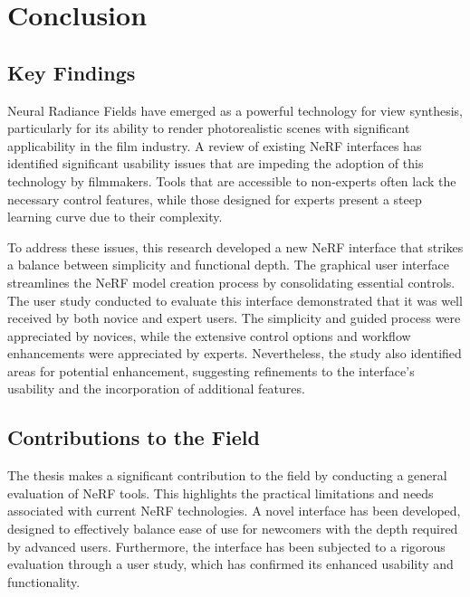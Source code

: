 \chapter{Conclusion}
\label{sec:conclusion}

\section{Key Findings}
\label{sec:conclusion:findings}

Neural Radiance Fields have emerged as a powerful technology for view synthesis, particularly for its ability to render photorealistic scenes with significant applicability in the film industry.
A review of existing NeRF interfaces has identified significant usability issues that are impeding the adoption of this technology by filmmakers.
Tools that are accessible to non-experts often lack the necessary control features, while those designed for experts present a steep learning curve due to their complexity.

To address these issues, this research developed a new NeRF interface that strikes a balance between simplicity and functional depth.
The graphical user interface streamlines the NeRF model creation process by consolidating essential controls.
The user study conducted to evaluate this interface demonstrated that it was well received by both novice and expert users.
The simplicity and guided process were appreciated by novices, while the extensive control options and workflow enhancements were appreciated by experts.
Nevertheless, the study also identified areas for potential enhancement, suggesting refinements to the interface's usability and the incorporation of additional features.

\section{Contributions to the Field}
\label{sec:conclusion:contributions}

The thesis makes a significant contribution to the field by conducting a general evaluation of NeRF tools. This highlights the practical limitations and needs associated with current NeRF technologies.
A novel interface has been developed, designed to effectively balance ease of use for newcomers with the depth required by advanced users.
Furthermore, the interface has been subjected to a rigorous evaluation through a user study, which has confirmed its enhanced usability and functionality.

